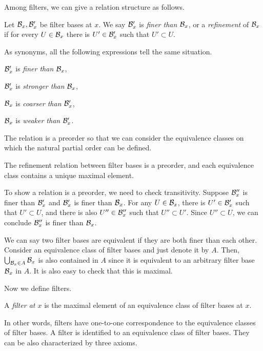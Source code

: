 \documentclass{../crs}
\begin{document}
Among filters, we can give a relation structure as follows.

\begin{defn}
Let $\mathcal{B}_x,\mathcal{B}'_x$ be filter bases at $x$.
We say $\mathcal{B}'_x$ is \emph{finer than} $\mathcal{B}_x$, or a \emph{refinement} of $\mathcal{B}_x$ if for every $U\in\mathcal{B}_x$ there is $U'\in\mathcal{B}'_x$ such that $U'\subset U$.
\end{defn}

As synonyms, all the following expressions tell the same situation.
\begin{cond}
\item $\mathcal{B}'_x$ is \emph{finer than} $\mathcal{B}_x$,
\item $\mathcal{B}'_x$ is \emph{stronger than} $\mathcal{B}_x$,
\item $\mathcal{B}_x$ is \emph{coarser than} $\mathcal{B}'_x$,
\item $\mathcal{B}_x$ is \emph{weaker than} $\mathcal{B}'_x$.
\end{cond}
The relation is a preorder so that we can consider the equivalence classes on which the natural partial order can be defined.

\begin{prop}
The refinement relation between filter bases is a preorder, and each equivalence class contains a unique maximal element.
\end{prop}
\begin{pf}
To show a relation is a preorder, we need to check transitivity.
Suppose $\mathcal{B}''_x$ is finer than $\mathcal{B}'_x$ and $\mathcal{B}'_x$ is finer than $\mathcal{B}_x$.
For any $U\in\mathcal{B}_x$, there is $U'\in\mathcal{B}'_x$ such that $U'\subset U$, and there is also $U''\in\mathcal{B}''_x$ such that $U''\subset U'$.
Since $U''\subset U$, we can conclude $\mathcal{B}''_x$ is finer than $\mathcal{B}_x$.

We can say two filter bases are equivalent if they are both finer than each other.
Consider an equivalence class of filter bases and just denote it by $A$.
Then, $\bigcup_{\mathcal{B}_x\in A}\mathcal{B}_x$ is also contained in $A$ since it is equivalent to an arbitrary filter base $\mathcal{B}_x$ in $A$.
It is also easy to check that this is maximal.
\end{pf}

Now we define filters.

\begin{defn}
A \emph{filter at $x$} is the maximal element of an equivalence class of filter bases at $x$.
\end{defn}

In other words, filters have one-to-one correspondence to the equivalence classes of filter bases.
A filter is identified to an equivalence class of filter bases.
They can be also characterized by three axioms.
\end{document}
